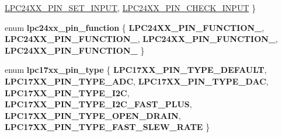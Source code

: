 \begin{DoxyCompactItemize}
\mbox{\hyperlink{group__lpc24xx__io_gga5fb61bf67da6335979ce02d1d7f3630ea3f273fb75885708510ffce367ba01386}{L\+P\+C24\+X\+X\+\_\+\+P\+I\+N\+\_\+\+S\+E\+T\+\_\+\+I\+N\+P\+UT}}, 
\mbox{\hyperlink{group__lpc24xx__io_gga5fb61bf67da6335979ce02d1d7f3630ea47a7ba57aa92996773a62c82cc45d340}{L\+P\+C24\+X\+X\+\_\+\+P\+I\+N\+\_\+\+C\+H\+E\+C\+K\+\_\+\+I\+N\+P\+UT}}
 \}
\item 
\mbox{\label{group__lpc24xx__io_gaf767b156545180b5516650c5e495f74d}} 
enum {\bfseries lpc24xx\+\_\+pin\+\_\+function} \{ {\bfseries L\+P\+C24\+X\+X\+\_\+\+P\+I\+N\+\_\+\+F\+U\+N\+C\+T\+I\+O\+N\+\_}, 
{\bfseries L\+P\+C24\+X\+X\+\_\+\+P\+I\+N\+\_\+\+F\+U\+N\+C\+T\+I\+O\+N\+\_}, 
{\bfseries L\+P\+C24\+X\+X\+\_\+\+P\+I\+N\+\_\+\+F\+U\+N\+C\+T\+I\+O\+N\+\_}, 
{\bfseries L\+P\+C24\+X\+X\+\_\+\+P\+I\+N\+\_\+\+F\+U\+N\+C\+T\+I\+O\+N\+\_}
 \}
\item 
\mbox{\label{group__lpc24xx__io_ga3b6881852e3efb0377829b578f392aab}} 
enum {\bfseries lpc17xx\+\_\+pin\+\_\+type} \{ \newline
{\bfseries L\+P\+C17\+X\+X\+\_\+\+P\+I\+N\+\_\+\+T\+Y\+P\+E\+\_\+\+D\+E\+F\+A\+U\+LT}, 
{\bfseries L\+P\+C17\+X\+X\+\_\+\+P\+I\+N\+\_\+\+T\+Y\+P\+E\+\_\+\+A\+DC}, 
{\bfseries L\+P\+C17\+X\+X\+\_\+\+P\+I\+N\+\_\+\+T\+Y\+P\+E\+\_\+\+D\+AC}, 
{\bfseries L\+P\+C17\+X\+X\+\_\+\+P\+I\+N\+\_\+\+T\+Y\+P\+E\+\_\+\+I2C}, 
\newline
{\bfseries L\+P\+C17\+X\+X\+\_\+\+P\+I\+N\+\_\+\+T\+Y\+P\+E\+\_\+\+I2\+C\+\_\+\+F\+A\+S\+T\+\_\+\+P\+L\+US}, 
{\bfseries L\+P\+C17\+X\+X\+\_\+\+P\+I\+N\+\_\+\+T\+Y\+P\+E\+\_\+\+O\+P\+E\+N\+\_\+\+D\+R\+A\+IN}, 
{\bfseries L\+P\+C17\+X\+X\+\_\+\+P\+I\+N\+\_\+\+T\+Y\+P\+E\+\_\+\+F\+A\+S\+T\+\_\+\+S\+L\+E\+W\+\_\+\+R\+A\+TE}
 \}
\end{DoxyCompactItemize}
